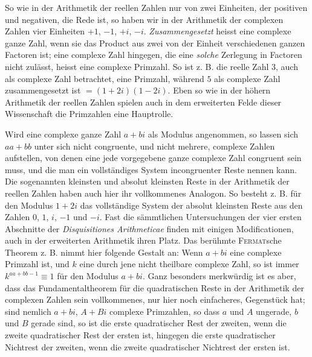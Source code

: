 So wie in der Arithmetik der reellen Zahlen nur von zwei Einheiten, der positiven und negativen, die Rede ist, so haben wir in der Arithmetik der 
%
complexen Zahlen vier Einheiten $+1$, $-1$, $+i$, $-i$. \emph{Zusammengesetzt} heisst eine complexe ganze Zahl, wenn sie das Product aus zwei von der Einheit verschiedenen ganzen Factoren ist; eine complexe Zahl hingegen, die eine \emph{solche} Zerlegung in Factoren nicht zulässt, heisst eine complexe Primzahl. So ist z. B. die reelle Zahl $3$, auch als complexe Zahl betrachtet, eine Primzahl, während $5$ als complexe Zahl zusammengesetzt ist $=(1+2i)(1-2i)$. Eben so wie in der höhern Arithmetik der reellen Zahlen spielen auch in dem erweiterten Felde dieser Wissenschaft die Primzahlen eine Hauptrolle.

Wird eine complexe ganze Zahl $a+bi$ als Modulus angenommen, so lassen sich $aa+bb$ unter sich nicht congruente, und nicht mehrere, complexe Zahlen aufstellen, von denen eine jede vorgegebene ganze complexe Zahl congruent sein muss, und die man ein vollständiges System incongruenter Reste nennen kann. Die sogenannten kleinsten und absolut kleinsten Reste in der Arithmetik der reellen Zahlen haben auch hier ihr vollkommenes Analogon. So besteht z. B. für den Modulus $1+2i$ das vollständige System der absolut kleinsten Reste aus den Zahlen $0$, $1$, $i$, $-1$ und $-i$. Fast die sämmtlichen Untersuchungen der vier ersten Abschnitte der \emph{Disquisitiones Arithmeticae} finden mit einigen Modificationen, auch in der erweiterten Arithmetik ihren Platz. Das berühmte \textsc{Fermat}sche Theorem z. B. nimmt hier folgende Gestalt an: Wenn $a+bi$ eine complexe Primzahl ist, und $k$ eine durch jene nicht theilbare complexe Zahl, so ist immer $k^{aa+bb-1}\equiv1$ für den Modulus $a+bi$. Ganz besonders merkwürdig ist es aber, dass das Fundamentaltheorem für die quadratischen Reste in der Arithmetik der complexen Zahlen sein vollkommenes, nur hier noch einfacheres, Gegenstück hat; sind nemlich $a+bi$, $A+Bi$ complexe Primzahlen, so dass $a$ und $A$ ungerade, $b$ und $B$ gerade sind, so ist die erste quadratischer Rest der zweiten, wenn die zweite quadratischer Rest der ersten ist, hingegen die erste quadratischer Nichtrest der zweiten, wenn die zweite quadratischer Nichtrest der ersten ist.

